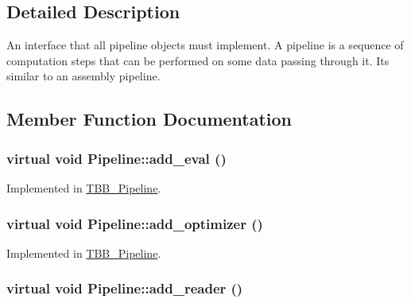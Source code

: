 \subsection{Detailed Description}
An interface that all pipeline objects must implement. A pipeline is a sequence of computation steps that can be performed on some data passing through it. Its similar to an assembly pipeline. 

\subsection{Member Function Documentation}
\hypertarget{class_pipeline_aa6fd3ded1ad9d36ced67ee2f888edd80}{
\subsubsection[{add\_\-eval}]{\setlength{\rightskip}{0pt plus 5cm}virtual void Pipeline::add\_\-eval ()}}
\label{class_pipeline_aa6fd3ded1ad9d36ced67ee2f888edd80}


Implemented in \hyperlink{class_t_b_b___pipeline_a8e0e2d2172adea44eceecb7538a69435}{TBB\_\-Pipeline}.

\hypertarget{class_pipeline_accee7285f24478fa58ad34a9d6bca1f4}{
\subsubsection[{add\_\-optimizer}]{\setlength{\rightskip}{0pt plus 5cm}virtual void Pipeline::add\_\-optimizer ()}}
\label{class_pipeline_accee7285f24478fa58ad34a9d6bca1f4}


Implemented in \hyperlink{class_t_b_b___pipeline_a69754a3a67b889f107a09cb54a86aa99}{TBB\_\-Pipeline}.

\hypertarget{class_pipeline_a7919be26846bd13f614f823f180aec42}{
\subsubsection[{add\_\-reader}]{\setlength{\rightskip}{0pt plus 5cm}virtual void Pipeline::add\_\-reader ()}}
\label{class_pipeline_a7919be26846bd13f614f823f180aec42}


